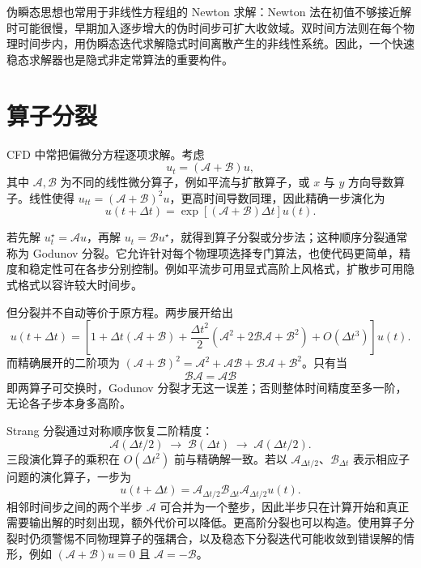 \documentclass[11pt,a4paper,openany,fontset=none]{ctexbook}
\begin{document}
伪瞬态思想也常用于非线性方程组的 Newton 求解：Newton 法在初值不够接近解时可能很慢，早期加入逐步增大的伪时间步可扩大收敛域。双时间方法则在每个物理时间步内，用伪瞬态迭代求解隐式时间离散产生的非线性系统。因此，一个快速稳态求解器也是隐式非定常算法的重要构件。

\section{算子分裂}

CFD 中常把偏微分方程逐项求解。考虑
\begin{equation}
 u_t=(\mathcal A+\mathcal B)u, \tag{1.19.1}
\end{equation}
其中 $\mathcal A,\mathcal B$ 为不同的线性微分算子，例如平流与扩散算子，或 $x$ 与 $y$ 方向导数算子。线性使得 $u_{tt}=(\mathcal A+\mathcal B)^2u$，更高时间导数同理，因此精确一步演化为
\begin{equation}
 u(t+\Delta t)=\exp[(\mathcal A+\mathcal B)\Delta t]u(t). \tag{1.19.6}
\end{equation}

若先解 $u_t^\star=\mathcal A u$，再解 $u_t=\mathcal B u^\star$，就得到算子分裂或分步法；这种顺序分裂通常称为 Godunov 分裂。它允许针对每个物理项选择专门算法，也使代码更简单，精度和稳定性可在各步分别控制。例如平流步可用显式高阶上风格式，扩散步可用隐式格式以容许较大时间步。

但分裂并不自动等价于原方程。两步展开给出
\begin{equation}
 u(t+\Delta t)=\left[1+\Delta t(\mathcal A+\mathcal B)
 +\frac{\Delta t^2}{2}(\mathcal A^2+2\mathcal B\mathcal A+\mathcal B^2)+O(\Delta t^3)\right]u(t). \tag{1.19.11}
\end{equation}
而精确展开的二阶项为 $(\mathcal A+\mathcal B)^2=\mathcal A^2+\mathcal A\mathcal B+\mathcal B\mathcal A+\mathcal B^2$。只有当
\begin{equation}\mathcal B\mathcal A=\mathcal A\mathcal B \tag{1.19.13}\end{equation}
即两算子可交换时，Godunov 分裂才无这一误差；否则整体时间精度至多一阶，无论各子步本身多高阶。

Strang 分裂通过对称顺序恢复二阶精度：
\begin{equation}
 \mathcal A(\Delta t/2)\;\longrightarrow\;\mathcal B(\Delta t)\;\longrightarrow\;\mathcal A(\Delta t/2). \tag{1.19.14--16}
\end{equation}
三段演化算子的乘积在 $O(\Delta t^2)$ 前与精确解一致。若以 $\mathcal A_{\Delta t/2}$、$\mathcal B_{\Delta t}$ 表示相应子问题的演化算子，一步为
\begin{equation}
 u(t+\Delta t)=\mathcal A_{\Delta t/2}\mathcal B_{\Delta t}\mathcal A_{\Delta t/2}u(t). \tag{1.19.18}
\end{equation}
相邻时间步之间的两个半步 $\mathcal A$ 可合并为一个整步，因此半步只在计算开始和真正需要输出解的时刻出现，额外代价可以降低。更高阶分裂也可以构造。使用算子分裂时仍须警惕不同物理算子的强耦合，以及稳态下分裂迭代可能收敛到错误解的情形，例如 $(\mathcal A+\mathcal B)u=0$ 且 $\mathcal A=-\mathcal B$。
\end{document}
